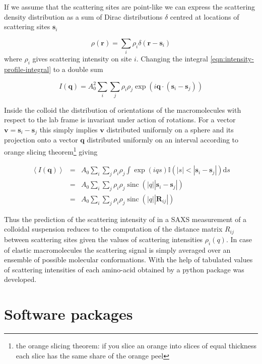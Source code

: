 \documentclass{doctoral}
\newcommand{\dd}{\mathrm{d}}
\newcommand{\code}[1]{\texttt{\detokenize{#1}}}
\begin{document}
If we assume that the scattering sites are point-like we can express the scattering density distribution as a sum of Dirac distributions $\delta$ centred at locations of scattering sites $\bm{s}_i$ 

\begin{equation}
    \rho(\bm{r}) = \sum_i \rho_i \delta(\bm{r}-\bm{s}_i)
\end{equation}
where $\rho_i$ gives scattering intensity on site $i$.
Changing the integral \eqref{eqn:intensity-profile-integral} to a double sum 

\begin{equation}
    I(\bm{q}) = A_0^2 \sum_i \sum_j \rho_i \rho_j \exp(i \bm{q} \cdot (\bm{s}_i - \bm{s}_j))
\end{equation}

Inside the colloid the distribution of orientations of the macromolecules with respect to the lab frame is invariant under action of rotations.
For a vector $\bm{v} = \bm{s}_i - \bm{s}_j$ this simply implies $\bm{v}$ distributed uniformly on a sphere and its projection onto a vector $\bm{q}$ distributed uniformly on an interval according to orange slicing theorem\footnote{the orange slicing theorem: if you slice an orange into slices of equal thickness each slice has the same share of the orange peel} giving 

\begin{eqnarray}
    \left< I(\bm{q}) \right> & = & A_0 \sum_i \sum_j \rho_i \rho_j \int \exp(i q s) \mathbb{I}(|s| < |\bm{s}_i - \bm{s}_j|) \dd s \\
                             & = & A_0 \sum_i \sum_j \rho_i \rho_j \operatorname{sinc}(|q||\bm{s}_i - \bm{s}_j|)                  \\
                             & = & A_0 \sum_i \sum_j \rho_i \rho_j \operatorname{sinc}(|q||\bm{R}_{ij}|)
\end{eqnarray}

Thus the prediction of the scattering intensity of in a SAXS measurement of a colloidal suspension reduces to the computation of the distance matrix $R_{ij}$ between scattering sites given the values of scattering intensities $\rho_i(q)$.
In case of elastic macromolecules the scattering signal is simply averaged over an ensemble of possible molecular conformations.
With the help of tabulated values of scattering intensities of each amino-acid obtained by \textcite{Tong_2016} a python package \code{saxs_single_bead} was developed.

\chapter{Software packages}
\end{document}
